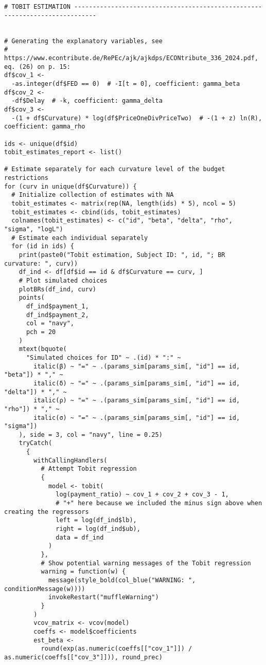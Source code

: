 \documentclass[12pt, a4paper, oneside]{article}
\theoremstyle{Plain}
\theoremstyle{Definition}
\theoremstyle{Remark}
\begin{document}
\begin{appendix}
\begin{lstlisting}
# TOBIT ESTIMATION ----------------------------------------------------------------------------


# Generating the explanatory variables, see
# https://www.econtribute.de/RePEc/ajk/ajkdps/ECONtribute_336_2024.pdf, eq. (26) on p. 15:
df$cov_1 <-
  -as.integer(df$FED == 0)  # -I[t = 0], coefficient: gamma_beta
df$cov_2 <-
  -df$Delay  # -k, coefficient: gamma_delta
df$cov_3 <-
  -(1 + df$Curvature) * log(df$PriceOneDivPriceTwo)  # -(1 + z) ln(R), coefficient: gamma_rho

ids <- unique(df$id)
tobit_estimates_report <- list()

# Estimate separately for each curvature level of the budget restrictions
for (curv in unique(df$Curvature)) {
  # Initialize collection of estimates with NA
  tobit_estimates <- matrix(rep(NA, length(ids) * 5), ncol = 5)
  tobit_estimates <- cbind(ids, tobit_estimates)
  colnames(tobit_estimates) <- c("id", "beta", "delta", "rho", "sigma", "logL")
  # Estimate each individual separately
  for (id in ids) {
    print(paste0("Tobit estimation, Subject ID: ", id, "; BR curvature: ", curv))
    df_ind <- df[df$id == id & df$Curvature == curv, ]
    # Plot simulated choices
    plotBRs(df_ind, curv)
    points(
      df_ind$payment_1,
      df_ind$payment_2,
      col = "navy",
      pch = 20
    )
    mtext(bquote(
      "Simulated choices for ID" ~ .(id) * ":" ~
        italic(β) ~ "=" ~ .(params_sim[params_sim[, "id"] == id, "beta"]) * "," ~
        italic(δ) ~ "=" ~ .(params_sim[params_sim[, "id"] == id, "delta"]) * "," ~
        italic(ρ) ~ "=" ~ .(params_sim[params_sim[, "id"] == id, "rho"]) * "," ~
        italic(σ) ~ "=" ~ .(params_sim[params_sim[, "id"] == id, "sigma"])
    ), side = 3, col = "navy", line = 0.25)
    tryCatch(
      {
        withCallingHandlers(
          # Attempt Tobit regression
          {
            model <- tobit(
              log(payment_ratio) ~ cov_1 + cov_2 + cov_3 - 1,
              # "+" here because we included the minus sign above when creating the regressors
              left = log(df_ind$lb),
              right = log(df_ind$ub),
              data = df_ind
            )
          },
          # Show potential warning messages of the Tobit regression
          warning = function(w) {
            message(style_bold(col_blue("WARNING: ", conditionMessage(w))))
            invokeRestart("muffleWarning")
          }
        )
        vcov_matrix <- vcov(model)
        coeffs <- model$coefficients
        est_beta <-
          round(exp(as.numeric(coeffs[["cov_1"]]) / as.numeric(coeffs[["cov_3"]])), round_prec)

\end{lstlisting}
\end{appendix}
\end{document}
